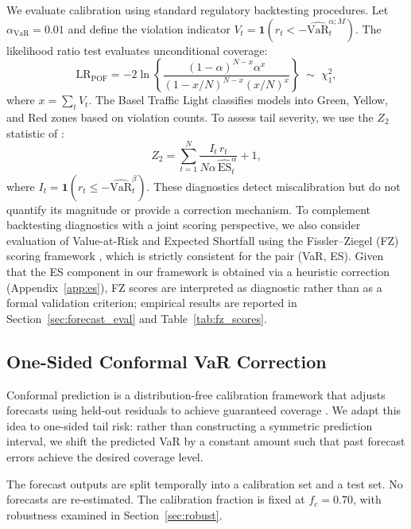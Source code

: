 \documentclass[preprint,11pt,authoryear]{elsarticle}
\newcommand{\VaR}{\mathrm{VaR}}
\newcommand{\ES}{\mathrm{ES}}
\newcommand{\1}{\boldsymbol{1}}
\begin{document}
	We evaluate calibration using standard regulatory backtesting
	procedures. Let $\alpha_{\mathrm{VaR}} = 0.01$ and define the
	violation indicator
	$V_t = \1(r_t < -\widehat{\VaR}_t^{\alpha;M})$. The
	\citet{kupiec1995} likelihood ratio test evaluates
	unconditional coverage:
	\begin{equation}
		\label{eq:kupiec}
		\mathrm{LR}_{\mathrm{POF}} = -2\ln\!\left\{
		\frac{(1-\alpha)^{N-x}\alpha^x}
		{(1-x/N)^{N-x}(x/N)^x}\right\}
		\;\sim\; \chi^2_1,
	\end{equation}
	where $x = \sum_t V_t$. The Basel Traffic Light
	\citep{basel1996} classifies models into Green, Yellow, and
	Red zones based on violation counts. To assess tail severity,
	we use the $Z_2$ statistic of \citet{acerbi2014back}:
	\begin{equation}
		\label{eq:Z2}
		Z_2 = \sum_{t=1}^N
		\frac{I_t\, r_t}{N\alpha\,\widehat{\ES}_t^\alpha} + 1,
	\end{equation}
	where $I_t = \1(r_t \leq -\widehat{\VaR}_t^\beta)$. These
	diagnostics detect miscalibration but do not quantify its
	magnitude or provide a correction mechanism.
	To complement backtesting diagnostics with a joint scoring perspective, we also consider evaluation of Value-at-Risk and Expected Shortfall using the Fissler--Ziegel (FZ) scoring framework \citep{fissler2016higher}, which is strictly consistent for the pair (VaR, ES). Given that the ES component in our framework is obtained via a heuristic correction (Appendix~\ref{app:es}), FZ scores are interpreted as diagnostic rather than as a formal validation criterion; empirical results are reported in Section~\ref{sec:forecast_eval} and Table~\ref{tab:fz_scores}.

	\subsection{One-Sided Conformal VaR Correction}
	\label{sec:cqr_var}
	
	Conformal prediction is a distribution-free calibration
	framework that adjusts forecasts using held-out residuals to
	achieve guaranteed coverage
	\citep{vovk2005algorithmic, romano2019conformalized}. We
	adapt this idea to one-sided tail risk: rather than
	constructing a symmetric prediction interval, we shift the
	predicted VaR by a constant amount such that past forecast
	errors achieve the desired coverage level.
	
	The forecast outputs are split temporally into a calibration
	set and a test set. No forecasts are re-estimated. The
	calibration fraction is fixed at $f_c = 0.70$, with
	robustness examined in Section~\ref{sec:robust}.
	
\end{document}
